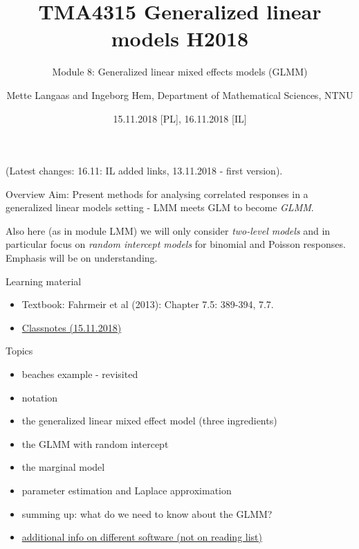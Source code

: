 \documentclass[
  ignorenonframetext,
]{beamer}
\title{\texorpdfstring{TMA4315 Generalized linear models
H2018}{TMA4315 Generalized linear models H2018}}
\subtitle{\texorpdfstring{Module 8: Generalized linear mixed effects
models
(GLMM)}{Module 8: Generalized linear mixed effects models (GLMM)}}
\author{\texorpdfstring{Mette Langaas and Ingeborg Hem, Department of
Mathematical Sciences,
NTNU}{Mette Langaas and Ingeborg Hem, Department of Mathematical Sciences, NTNU}}
\date{15.11.2018 {[}PL{]}, 16.11.2018 {[}IL{]}}
\providecommand{\tightlist}{%
  \setlength{\itemsep}{0pt}\setlength{\parskip}{0pt}}
\begin{document}
\frame{\titlepage}

\begin{frame}
(Latest changes: 16.11: IL added links, 13.11.2018 - first version).
\end{frame}

\begin{frame}{Overview}
\protect{}\label{overview}
Aim: Present methods for analysing correlated responses in a generalized
linear models setting - LMM meets GLM to become \emph{GLMM}.

Also here (as in module LMM) we will only consider \emph{two-level
models} and in particular focus on \emph{random intercept models} for
binomial and Poisson responses. Emphasis will be on understanding.
\end{frame}

\begin{frame}
\begin{block}{Learning material}
\protect{}\label{learning-material}
\begin{itemize}
\tightlist
\item
  Textbook: Fahrmeir et al (2013): Chapter 7.5: 389-394, 7.7.
\item
  \href{https://www.math.ntnu.no/emner/TMA4315/2018h/M8PL.pdf}{Classnotes
  (15.11.2018)}
\end{itemize}
\end{block}
\end{frame}

\begin{frame}
\begin{block}{Topics}
\protect{}\label{topics}
\begin{itemize}
\tightlist
\item
  beaches example - revisited
\item
  notation
\item
  the generalized linear mixed effect model (three ingredients)
\item
  the GLMM with random intercept
\item
  the marginal model
\item
  parameter estimation and Laplace approximation
\item
  summing up: what do we need to know about the GLMM?
\item
  \hyperlink{additional}{additional info on different software (not on
  reading list)}
\end{itemize}
\end{block}
\end{frame}
\end{document}
